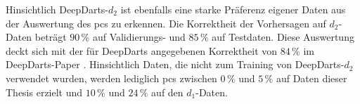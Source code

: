 Hinsichtlich DeepDarts-$d_2$ ist ebenfalls eine starke Präferenz eigener Daten aus der Auswertung des \ac{pcs} zu erkennen. Die Korrektheit der Vorhersagen auf $d_2$-Daten beträgt $90\,\%$ auf Validierungs- und $85\,\%$ auf Testdaten. Diese Auswertung deckt sich mit der für DeepDarts angegebenen Korrektheit von $84\,\%$ im DeepDarts-Paper \cite{deepdarts}. Hinsichtlich Daten, die nicht zum Training von DeepDarts-$d_2$ verwendet wurden, werden lediglich \ac{pcs} zwischen $0\,\%$ und $5\,\%$ auf Daten dieser Thesis erzielt und $10\,\%$ und $24\,\%$ auf den $d_1$-Daten.
